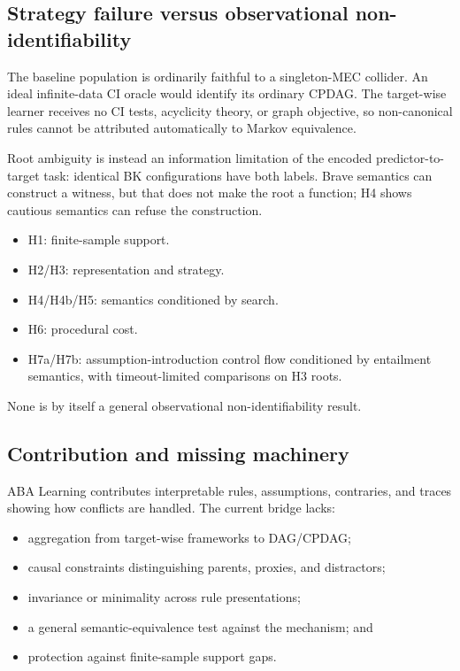 \documentclass[11pt]{article}
\begin{document}
\subsection{Strategy failure versus observational non-identifiability}

The baseline population is ordinarily faithful to a singleton-MEC collider.
An ideal infinite-data CI oracle would identify its ordinary CPDAG. The
target-wise learner receives no CI tests, acyclicity theory, or graph objective,
so non-canonical rules cannot be attributed automatically to Markov
equivalence.

Root ambiguity is instead an information limitation of the encoded
predictor-to-target task: identical BK configurations have both labels. Brave
semantics can construct a witness, but that does not make the root a function;
H4 shows cautious semantics can refuse the construction.

\begin{itemize}
  \item H1: finite-sample support.
  \item H2/H3: representation and strategy.
  \item H4/H4b/H5: semantics conditioned by search.
  \item H6: procedural cost.
  \item H7a/H7b: assumption-introduction control flow conditioned by
  entailment semantics, with timeout-limited comparisons on H3 roots.
\end{itemize}
None is by itself a general observational non-identifiability result.

\subsection{Contribution and missing machinery}

ABA Learning contributes interpretable rules, assumptions, contraries, and
traces showing how conflicts are handled. The current bridge lacks:

\begin{itemize}
  \item aggregation from target-wise frameworks to DAG/CPDAG;
  \item causal constraints distinguishing parents, proxies, and distractors;
  \item invariance or minimality across rule presentations;
  \item a general semantic-equivalence test against the mechanism; and
  \item protection against finite-sample support gaps.
\end{itemize}
\end{document}
